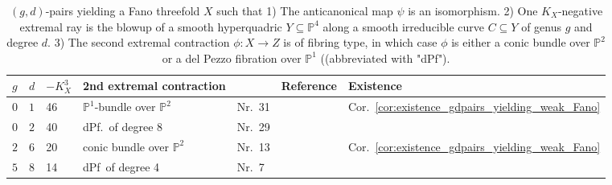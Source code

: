 \documentclass[english,11pt,reqno]{amsart}
\newcommand{\sub}{\subseteq}
\newcommand{\Pone}{\mathbb{P}^1}
\newcommand{\Ptwo}{\mathbb{P}^2}
\newcommand{\Pfour}{\mathbb{P}^4}
\begin{document}
%
\vspace{-0.5cm}
\begin{table}[H]
\caption{$(g,d)$-pairs yielding a Fano threefold $X$ such that 1) The anticanonical map $\psi$ is an isomorphism. 2) One $K_X$-negative extremal ray is the blowup of a smooth hyperquadric $Y\sub \Pfour$ along a smooth irreducible curve $C\sub Y$ of genus $g$ and degree $d$. 3) The second extremal contraction $\phi:X\rightarrow Z$ is of fibring type, in which case $\phi$ is either a conic bundle over $\Ptwo$ or a del Pezzo fibration over $\Pone$ ((abbreviated with "dPf").}
\label{table:Fano_threefolds_fibring_type}
\begin{minipage}[h]{\textwidth}
\vspace{5pt}
\centering
\begin{tabular}{|l|l|l|l|l|l|l|}
\hline
$g$ & $d$ & $-K_X^3$ & 2nd extremal contraction & \cite{Mori_Mukai-Fano_threefolds_Picard_rank_2} & Reference & Existence\\
\hline
$0$ & $1$ & 46 & $\Pone$-bundle over $\Ptwo$ & Nr.\ 31 &  \cite[Lemma 3.22]{Fano_threefolds} & Cor.\ \ref{cor:existence_gdpairs_yielding_weak_Fano}\\
\hline
$0$ & $2$ & 40 & dPf.\ of degree 8  & Nr.\ 29 & \cite[(2.3.1)]{Takeuchi-Weak_Fano_threefolds_del_Pezzo_fibration} & \cite[(4.6.1.)]{Takeuchi-Weak_Fano_threefolds_del_Pezzo_fibration}
\\
\hline
$2$ & $6$ & 20 & conic bundle over $\Ptwo$& Nr.\ 13 & \cite[\S 5.5]{Fano_threefolds} & Cor.\ \ref{cor:existence_gdpairs_yielding_weak_Fano}\\
\hline
$5$ & $8$ & 14 & dPf\ of degree 4 & Nr.\ 7 & \cite[(2.11.3.)]{Takeuchi-Weak_Fano_threefolds_del_Pezzo_fibration} 
& \cite[(7.6.3.)]{Takeuchi-Weak_Fano_threefolds_del_Pezzo_fibration} 
\\ 
\hline
\end{tabular}		
\end{minipage}
\end{table}	
%
%
\end{document}
